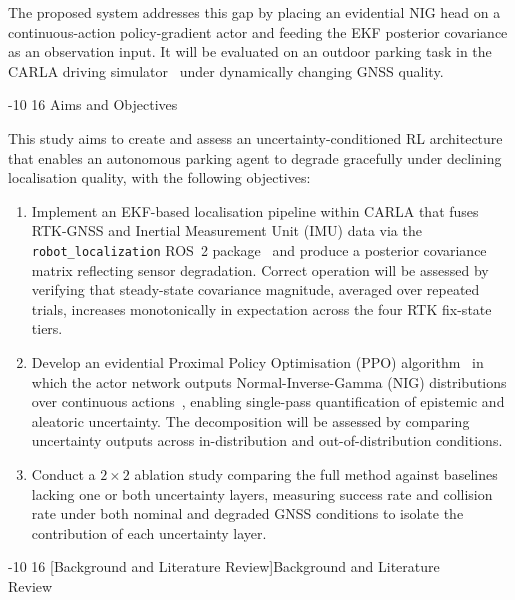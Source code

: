 \documentclass{sig-alternate}
\makeatletter
\renewcommand\section{\@startsection{section}{1}{\z@}%
    {-10\p@ \@plus -4\p@ \@minus -2\p@}%
    {16\p@}%
    {\baselineskip 14pt\secfnt\@ucheadtrue}}
\makeatother
\begin{document}
The proposed system addresses this gap by placing an evidential NIG head on a continuous-action policy-gradient actor and feeding the EKF posterior covariance as an observation input. It will be evaluated on an outdoor parking task in the CARLA driving simulator~\cite{dosovitskiy2017carla} under dynamically changing GNSS quality.

\section{Aims and Objectives}
\label{sec:aims}

This study aims to create and assess an uncertainty-conditioned RL architecture that enables an autonomous parking agent to degrade gracefully under declining localisation quality, with the following objectives:

\begin{enumerate}
    \item Implement an EKF-based localisation pipeline within CARLA that fuses RTK-GNSS and Inertial Measurement Unit (IMU) data via the \texttt{robot\_localization} ROS~2 package~\cite{moore2014ekf} and produce a posterior covariance matrix reflecting sensor degradation. Correct operation will be assessed by verifying that steady-state covariance magnitude, averaged over repeated trials, increases monotonically in expectation across the four RTK fix-state tiers.
    \item Develop an evidential Proximal Policy Optimisation (PPO) algorithm~\cite{schulman2017ppo} in which the actor network outputs Normal-Inverse-Gamma (NIG) distributions over continuous actions~\cite{amini2020deep}, enabling single-pass quantification of epistemic and aleatoric uncertainty. The decomposition will be assessed by comparing uncertainty outputs across in-distribution and out-of-distribution conditions.
    \item Conduct a $2 \times 2$ ablation study comparing the full method against baselines lacking one or both uncertainty layers, measuring success rate and collision rate under both nominal and degraded GNSS conditions to isolate the contribution of each uncertainty layer.
\end{enumerate}

\section[Background and Literature Review]{Background and Literature\\Review}
\label{sec:background}
\end{document}
